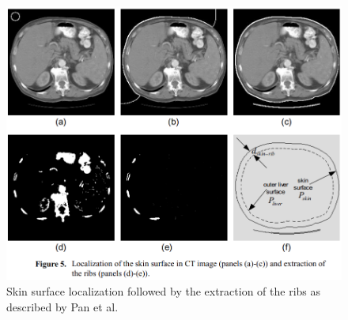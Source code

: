 \documentclass[]{article}
\begin{document}
\begin{figure}[ht!]
	\centering
	\includegraphics[width=0.7\linewidth]{images/image7}
	\caption{Skin surface localization followed by the extraction of the ribs as described by Pan et al. \cite{Pan2001}}
	\label{Pan2001_Fig5}
\end{figure}
\end{document}
